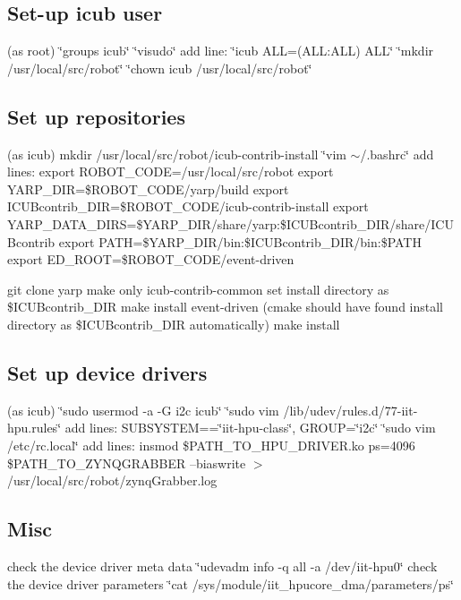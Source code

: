 \subsection*{Set-\/up icub user}

(as root) \char`\"{}groups icub\char`\"{} \char`\"{}visudo\char`\"{} add line\+: \char`\"{}icub A\+L\+L=(\+A\+L\+L\+:\+A\+L\+L) A\+L\+L\char`\"{} \char`\"{}mkdir /usr/local/src/robot\char`\"{} \char`\"{}chown icub /usr/local/src/robot\char`\"{}

\subsection*{Set up repositories}

(as icub) mkdir /usr/local/src/robot/icub-\/contrib-\/install \char`\"{}vim $\sim$/.\+bashrc\char`\"{} add lines\+: export R\+O\+B\+O\+T\+\_\+\+C\+O\+DE=/usr/local/src/robot export Y\+A\+R\+P\+\_\+\+D\+IR=\$\+R\+O\+B\+O\+T\+\_\+\+C\+O\+DE/yarp/build export I\+C\+U\+Bcontrib\+\_\+\+D\+IR=\$\+R\+O\+B\+O\+T\+\_\+\+C\+O\+DE/icub-\/contrib-\/install export Y\+A\+R\+P\+\_\+\+D\+A\+T\+A\+\_\+\+D\+I\+RS=\$\+Y\+A\+R\+P\+\_\+\+D\+IR/share/yarp\+:\$\+I\+C\+U\+Bcontrib\+\_\+\+D\+IR/share/\+I\+C\+U\+Bcontrib export P\+A\+TH=\$\+Y\+A\+R\+P\+\_\+\+D\+IR/bin\+:\$\+I\+C\+U\+Bcontrib\+\_\+\+D\+IR/bin\+:\$\+P\+A\+TH export E\+D\+\_\+\+R\+O\+OT=\$\+R\+O\+B\+O\+T\+\_\+\+C\+O\+DE/event-\/driven

git clone yarp make only icub-\/contrib-\/common set install directory as \$\+I\+C\+U\+Bcontrib\+\_\+\+D\+IR make install event-\/driven (cmake should have found install directory as \$\+I\+C\+U\+Bcontrib\+\_\+\+D\+IR automatically) make install

\subsection*{Set up device drivers}

(as icub) \char`\"{}sudo usermod -\/a -\/\+G i2c icub\char`\"{} \char`\"{}sudo vim /lib/udev/rules.\+d/77-\/iit-\/hpu.\+rules\char`\"{} add lines\+: S\+U\+B\+S\+Y\+S\+T\+EM==\char`\"{}iit-\/hpu-\/class\char`\"{}, G\+R\+O\+UP=\char`\"{}i2c\char`\"{} \char`\"{}sudo vim /etc/rc.\+local\char`\"{} add lines\+: insmod \$\+P\+A\+T\+H\+\_\+\+T\+O\+\_\+\+H\+P\+U\+\_\+\+D\+R\+I\+V\+E\+R.\+ko ps=4096 \$\+P\+A\+T\+H\+\_\+\+T\+O\+\_\+\+Z\+Y\+N\+Q\+G\+R\+A\+B\+B\+ER --biaswrite $>$ /usr/local/src/robot/zynq\+Grabber.log

\subsection*{Misc}

check the device driver meta data \char`\"{}udevadm info -\/q all -\/a /dev/iit-\/hpu0\char`\"{} check the device driver parameters \char`\"{}cat /sys/module/iit\+\_\+hpucore\+\_\+dma/parameters/ps\char`\"{} 